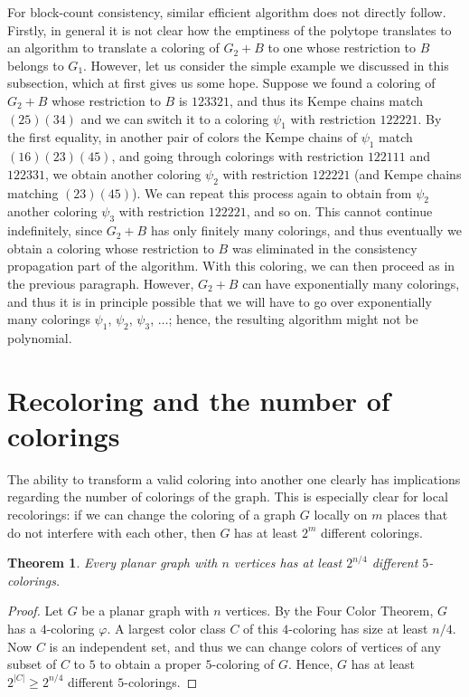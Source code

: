 \documentclass[12pt,twoside,openright,a4paper]{book}
\newtheorem{theorem}{Theorem}[chapter]
\begin{document}
For block-count consistency, similar efficient algorithm does not directly follow.  Firstly, in general it is not clear how the emptiness of the
polytope translates to an algorithm to translate a coloring of $G_2+B$ to one whose restriction to $B$ belongs to $G_1$.  However, let us consider
the simple example we discussed in this subsection, which at first gives us some hope.
Suppose we found a coloring of $G_2+B$ whose restriction to $B$ is $123321$, and thus its Kempe chains match $(25)(34)$ and we can switch
it to a coloring $\psi_1$ with restriction $122221$.  By the first equality, in another pair of colors the Kempe chains of $\psi_1$ match
$(16)(23)(45)$, and going through colorings with restriction $122111$ and $122331$, we obtain another coloring $\psi_2$ with restriction $122221$
(and Kempe chains matching $(23)(45)$).  We can repeat this process again to obtain from $\psi_2$ another coloring $\psi_3$ with restriction $122221$,
and so on.  This cannot continue indefinitely, since $G_2+B$ has only finitely many colorings, and thus eventually we obtain a coloring whose restriction to $B$
was eliminated in the consistency propagation part of the algorithm.  With this coloring, we can then proceed as in the previous paragraph.
However, $G_2+B$ can have exponentially many colorings, and thus it is in principle possible that we will have to go over exponentially many colorings $\psi_1$, $\psi_2$, $\psi_3$, $\dots$;
hence, the resulting algorithm might not be polynomial.

\section{Recoloring and the number of colorings}

The ability to transform a valid coloring into another one clearly has implications regarding the number of colorings
of the graph.  This is especially clear for local recolorings:  if we can change the coloring of a graph $G$ locally on $m$ places
that do not interfere with each other, then $G$ has at least $2^m$ different colorings.

\begin{theorem}\label{theorem:planar5many}
Every planar graph with $n$ vertices has at least $2^{n/4}$ different $5$-colorings.
\end{theorem}
\begin{proof}
Let $G$ be a planar graph with $n$ vertices.  By the Four Color Theorem, $G$ has a $4$-coloring $\varphi$.
A largest color class $C$ of this $4$-coloring has size at least $n/4$.  Now $C$ is an independent set, and
thus we can change colors of vertices of any subset of $C$ to $5$ to obtain a proper $5$-coloring of $G$.
Hence, $G$ has at least $2^{|C|}\ge 2^{n/4}$ different $5$-colorings.
\end{proof}
\end{document}
